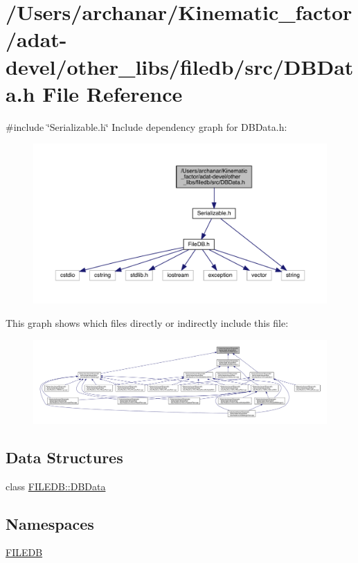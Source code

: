 \hypertarget{adat-devel_2other__libs_2filedb_2src_2DBData_8h}{}\section{/\+Users/archanar/\+Kinematic\+\_\+factor/adat-\/devel/other\+\_\+libs/filedb/src/\+D\+B\+Data.h File Reference}
\label{adat-devel_2other__libs_2filedb_2src_2DBData_8h}
{\ttfamily \#include \char`\"{}Serializable.\+h\char`\"{}}\newline
Include dependency graph for D\+B\+Data.\+h\+:
\nopagebreak
\begin{figure}[H]
\begin{center}
\leavevmode
\includegraphics[width=350pt]{d0/d1f/adat-devel_2other__libs_2filedb_2src_2DBData_8h__incl}
\end{center}
\end{figure}
This graph shows which files directly or indirectly include this file\+:
\nopagebreak
\begin{figure}[H]
\begin{center}
\leavevmode
\includegraphics[width=350pt]{da/de3/adat-devel_2other__libs_2filedb_2src_2DBData_8h__dep__incl}
\end{center}
\end{figure}
\subsection*{Data Structures}
\begin{DoxyCompactItemize}
\item 
class \mbox{\hyperlink{classFILEDB_1_1DBData}{F\+I\+L\+E\+D\+B\+::\+D\+B\+Data}}
\end{DoxyCompactItemize}
\subsection*{Namespaces}
\begin{DoxyCompactItemize}
\item 
 \mbox{\hyperlink{namespaceFILEDB}{F\+I\+L\+E\+DB}}
\end{DoxyCompactItemize}
